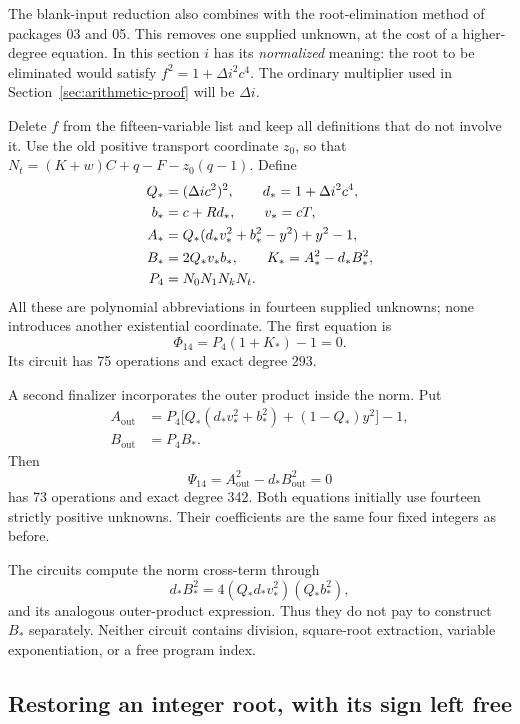 The blank-input reduction also combines with the root-elimination method
of packages 03 and 05. This removes one supplied unknown, at the cost
of a higher-degree equation. In this section \(i\) has its
\emph{normalized} meaning: the root to be eliminated would satisfy
\(f^2=1+\Delta i^2c^4\). The ordinary multiplier used in
Section~\ref{sec:arithmetic-proof} will be \(\Delta i\).

Delete \(f\) from the fifteen-variable list and keep all definitions
that do not involve it. Use the old positive transport coordinate
\(z_0\), so that \(N_t=(K+w)C+q-F-z_0(q-1)\). Define
\begin{align}
 Q_*&=(\Delta ic^2)^2,\qquad d_*=1+\Delta i^2c^4,\notag\\
 b_*&=c+Rd_*,\qquad v_*=cT,\notag\\
 A_*&=Q_*(d_*v_*^2+b_*^2-y^2)+y^2-1,\notag\\
 B_*&=2Q_*v_*b_*,\qquad K_*=A_*^2-d_*B_*^2,\notag\\
 P_4&=N_0N_1N_kN_t.\label{eq:rootdata14}
\end{align}
All these are polynomial abbreviations in fourteen supplied unknowns;
none introduces another existential coordinate. The first equation is
\begin{equation}\boxed{\Phi_{14}=P_4(1+K_*)-1=0.}
\label{eq:phi14}\end{equation}
Its circuit has 75 operations and exact degree 293.

A second finalizer incorporates the outer product inside the norm.
Put
\begin{align*}
 A_{\mathrm{out}}
   &=P_4\bigl[Q_*(d_*v_*^2+b_*^2)+(1-Q_*)y^2\bigr]-1,\\
 B_{\mathrm{out}}&=P_4B_*.
\end{align*}
Then
\begin{equation}\boxed{\Psi_{14}
 =A_{\mathrm{out}}^2-d_*B_{\mathrm{out}}^2=0}
\label{eq:psi14}\end{equation}
has 73 operations and exact degree 342. Both equations initially use
fourteen strictly positive unknowns. Their coefficients are the same
four fixed integers as before.

The circuits compute the norm cross-term through
\[
 d_*B_*^2=4(Q_*d_*v_*^2)(Q_*b_*^2),
\]
and its analogous outer-product expression. Thus they do not pay to
construct \(B_*\) separately. Neither circuit contains division,
square-root extraction, variable exponentiation, or a free program index.

\subsection{Restoring an integer root, with its sign left free}

